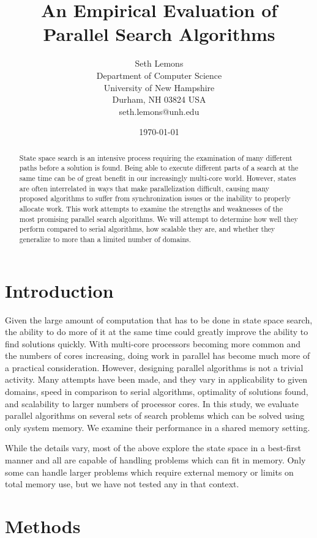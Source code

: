 \documentclass{article}
\title{An Empirical Evaluation of Parallel Search Algorithms}
\author{Seth Lemons \\
Department of Computer Science \\
University of New Hampshire \\
Durham, NH 03824 USA \\
seth.lemons@unh.edu}
\date{\today}
\begin{document}
\maketitle

\begin{abstract}
State space search is an intensive process requiring the examination of many different paths before a solution is found. Being able to execute different parts of a search at the same time can be of great benefit in our increasingly multi-core world. However, states are often interrelated in ways that make parallelization difficult, causing many proposed algorithms to suffer from synchronization issues or the inability to properly allocate work. This work attempts to examine the strengths and weaknesses of the most promising parallel search algorithms. We will attempt to determine how well they perform compared to serial algorithms, how scalable they are, and whether they generalize to more than a limited number of domains.
\end{abstract}

\section{Introduction}
Given the large amount of computation that has to be done in state space search, the ability to do more of it at the same time could greatly improve the ability to find solutions quickly. With multi-core processors becoming more common and the numbers of cores increasing, doing work in parallel has become much more of a practical consideration. However, designing parallel algorithms is not a trivial activity. Many attempts have been made, and they vary in applicability to given domains, speed in comparison to serial algorithms, optimality of solutions found, and scalability to larger numbers of processor cores. In this study, we evaluate parallel algorithms on several sets of search problems which can be solved using only system memory. We examine their performance in a shared memory setting.

While the details vary, most of the above explore the state space in a best-first manner and all are capable of handling problems which can fit in memory. Only some can handle larger problems which require external memory or limits on total memory use, but we have not tested any in that context.
\section{Methods}
\end{document}
